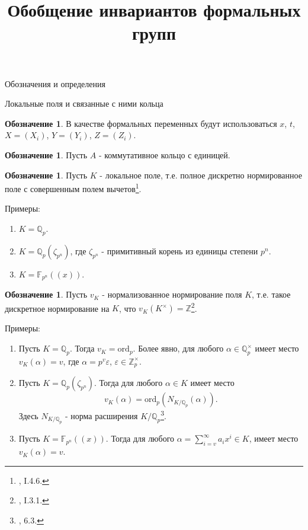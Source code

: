 \documentclass[a4paper,14pt]{extarticle}
\title{Обобщение инвариантов формальных групп}
\author{}
\date{}
\theoremstyle{definition}
\newtheorem{denotation}[definition]{Обозначение}
\newcommand{\ord}{\mathrm{ord}}
\newcommand{\bF}{\mathbb{F}}
\newcommand{\bQ}{\mathbb{Q}}
\newcommand{\bZ}{\mathbb{Z}}
\begin{document}
\maketitle

\begin{section}{Обозначения и определения}

\begin{subsection}{Локальные поля и связанные с ними кольца}

\begin{denotation}\label{denote:1.0:XYZ}
    В качестве формальных переменных будут использоваться $x$, $t$, ${ X = (X_i) }$, ${ Y = (Y_i) }$, ${ Z = (Z_i) }$.
\end{denotation}

\begin{denotation}\label{denote:1.0:A}
    Пусть $A$ - коммутативное кольцо с единицей.
\end{denotation}

\begin{denotation}\label{denote:1.0:K}
    Пусть $K$ - локальное поле, т.е. полное дискретно нормированное поле с совершенным полем вычетов\footnote{
        \cite{FesenkoVostokov}, I.4.6.
    }.
\end{denotation}

Примеры:
\begin{enumerate}
    \item ${ K = \bQ_p }$.
    \item ${ K = \bQ_p(\zeta_{p^n}) }$, где $\zeta_{p^n}$ - примитивный корень из единицы степени $p^n$.
    \item ${ K = \bF_{p^n}((x)) }$.
\end{enumerate}

\begin{denotation}\label{denote:1.1:v_K}
    Пусть $v_K$ - нормализованное нормирование поля $K$, т.е. такое дискретное нормирование на $K$, что ${ v_K(K^\times) = \bZ }$\footnote{
        \cite{FesenkoVostokov}, I.3.1.
    }.
\end{denotation}

Примеры:
\begin{enumerate}
    \item Пусть ${ K = \bQ_p }$. Тогда ${ v_K = \ord_p }$. Более явно, для любого ${ \alpha \in \bQ_p^\times }$ имеет место ${ v_K(\alpha) = v }$, где ${ \alpha = p^v \varepsilon }$, ${ \varepsilon \in \bZ_p^\times }$.
    \item Пусть ${ K = \bQ_p(\zeta_{p^n}) }$. Тогда для любого ${ \alpha \in K }$ имеет место
    \begin{equation*}
        v_K(\alpha) =
        \ord_p\left(N_{K/\bQ_p}(\alpha)\right).
    \end{equation*}
    Здесь $N_{K/\bQ_p}$ - норма расширения ${ K / \bQ_p }$\footnote{
        \cite{Gouvea}, 6.3.
    }.
    \item Пусть ${ K = \bF_{p^n}((x)) }$. Тогда для любого ${ \alpha = \sum\limits_{i = v}^\infty a_i x^i \in K }$, имеет место ${ v_K(\alpha) = v }$.
\end{enumerate}


\end{subsection}
\end{section}
\end{document}
